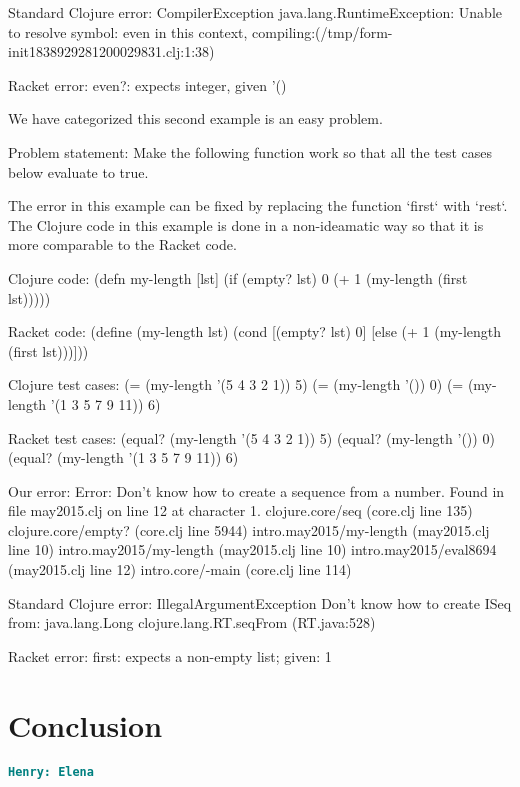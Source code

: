 \documentclass[12pt]{article}
\newcommand{\comment}[1]{{\bf \tt  {#1}}}
\newcommand{\hfcomment}[1]{\textcolor{Teal}{\comment{Henry: {#1}}}}
\begin{document}
	Standard Clojure error:
		CompilerException java.lang.RuntimeException: Unable to resolve symbol: even in this context, 	compiling:(/tmp/form-init1838929281200029831.clj:1:38) 

	Racket error:
		even?: expects integer, given '()



	We have categorized this second example is an easy problem.

	Problem statement:
		Make the following function work so that all the test cases below evaluate to true. 
		
	The error in this example can be fixed by replacing the function `first` with `rest`.
	The Clojure code in this example is done in a non-ideamatic way so that it is more comparable to the Racket code.
		
	Clojure code:
		(defn my-length [lst]
 			(if (empty? lst) 0 (+ 1 (my-length (first lst)))))
		
	Racket code:
		(define (my-length lst)
  			(cond
 				[(empty? lst) 0]
   				[else (+ 1 (my-length (first lst)))]))
		
	Clojure test cases:
		(= (my-length '(5 4 3 2 1)) 5)
		(= (my-length '()) 0)
		(= (my-length '(1 3 5 7 9 11)) 6)
		
	Racket test cases:
		(equal? (my-length '(5 4 3 2 1)) 5)
		(equal? (my-length '()) 0)
		(equal? (my-length '(1 3 5 7 9 11)) 6)
		
	Our error:
		Error: Don't know how to create a sequence from a number.
		Found in file may2015.clj on line 12 at character 1.
        clojure.core/seq (core.clj line 135)
        clojure.core/empty? (core.clj line 5944)
        intro.may2015/my-length (may2015.clj line 10)
        intro.may2015/my-length (may2015.clj line 10)
        intro.may2015/eval8694 (may2015.clj line 12)
        intro.core/-main (core.clj line 114)
		
	Standard Clojure error:
		IllegalArgumentException Don't know how to create ISeq from: java.lang.Long  clojure.lang.RT.seqFrom (RT.java:528)


	Racket error:
		first: expects a non-empty list; given: 1
		



\section{Conclusion}\label{sec:conclusion}
	\hfcomment{Elena}




\end{document}
